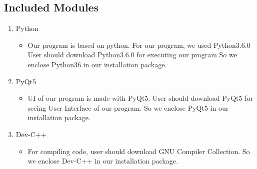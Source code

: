\documentclass[conference]{IEEEtran}
\begin{document}
\subsection{Included Modules}
\begin{enumerate}
\item{Python}
\begin{itemize}
\item Our program is based on python. For our program, we used Python3.6.0
User should download Python3.6.0 for executing our program
So we enclose Python36 in our installation package.
\end{itemize}
\item{PyQt5}
\begin{itemize}
\item UI of our program is made with PyQt5.
User should download PyQt5 for seeing User Interface of our program.
So we enclose PyQt5 in our installation package.
\end{itemize}
\item{Dev-C++}\\
\begin{itemize}
\item For compiling code, user should download GNU Compiler Collection.
So we enclose Dev-C++ in our installation package.
\end{itemize}
\end{enumerate}

\vfill

\onecolumn
\appendices
\end{document}
